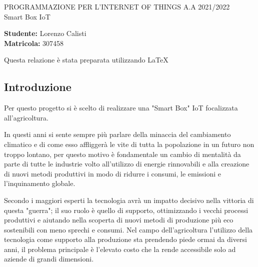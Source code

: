 \documentclass[a4paper, 12pt]{report}
\begin{document}
\begin{titlepage}
  \begin{center}
    \LARGE{PROGRAMMAZIONE PER L'INTERNET OF THINGS A.A 2021/2022} \\
    \vspace{9cm}
    \Huge{Smart Box IoT}
  \end{center}
  \vspace*{\fill}
  \begin{flushright}
    \large{\textbf{Studente:} Lorenzo Calisti} \\
    \large{\textbf{Matricola:} 307458}
  \end{flushright}
  \vspace{1cm}
  \begin{center}
Questa relazione è stata preparata utilizzando \LaTeX
  \end{center}
\end{titlepage}

\subsection*{Introduzione}
\vspace{0.5cm}

Per questo progetto si è scelto di realizzare una "Smart Box" IoT focalizzata all'agricoltura. 

In questi anni si sente sempre più parlare della minaccia del cambiamento climatico e di come esso affliggerà le vite di tutta la popolazione in un futuro non troppo lontano, per questo motivo è fondamentale 
un cambio di mentalità da parte di tutte le industrie volto all'utilizzo di energie rinnovabili e alla creazione di nuovi metodi produttivi in modo di ridurre i consumi, le emissioni e l'inquinamento globale.

Secondo i maggiori esperti la tecnologia avrà un impatto decisivo nella vittoria di questa "guerra"; il suo ruolo è quello di supporto, ottimizzando i vecchi processi produttivi
e aiutando nella scoperta di nuovi metodi di produzione più eco sostenibili con meno sprechi e consumi.
Nel campo dell'agricoltura l'utilizzo della tecnologia come supporto alla produzione sta prendendo piede ormai da diversi anni, il problema principale è l'elevato costo che la rende accessibile solo ad aziende di grandi dimensioni.
\end{document}
